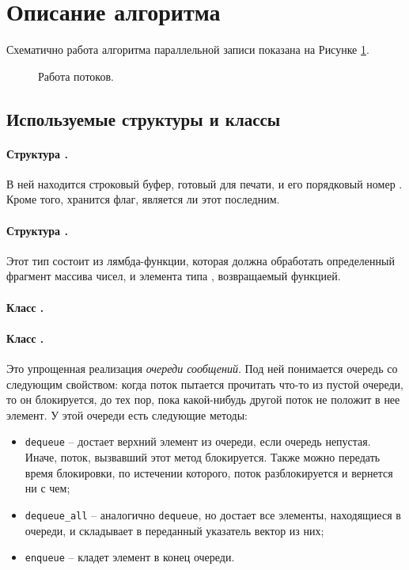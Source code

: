 \section{Описание алгоритма} \label{sec1}
Схематично работа алгоритма параллельной записи показана на Рисунке \ref{draw}.
\begin{figure}[h!]
\begin{footnotesize}
\def\svgwidth{430pt}
  
  \caption{Работа потоков.} \label{draw}
\end{footnotesize}\end{figure}

\subsection{Используемые структуры и классы}
\paragraph{Структура \texttt{}.}
В ней находится строковый буфер, готовый для печати, и его порядковый номер \texttt{}.
Кроме того, хранится флаг, является ли этот \texttt{} последним.
\paragraph{Структура \texttt{}.}
Этот тип состоит из лямбда-функции, которая должна обработать определенный фрагмент массива чисел, и элемента типа \texttt{}, возвращаемый функцией.
\paragraph{Класс \texttt{}.}

\paragraph{Класс \texttt{}.}
Это упрощенная реализация \textit{очереди сообщений}.  
Под ней понимается очередь со следующим свойством: когда поток пытается прочитать что-то из пустой очереди, то он блокируется, до тех пор, пока какой-нибудь другой поток не положит в нее элемент.
У этой очереди есть следующие методы:
\begin{itemize}
\item \texttt{dequeue} -- достает верхний элемент из очереди, если очередь непустая.
Иначе, поток, вызвавший этот метод блокируется. Также можно передать время блокировки, по истечении которого, поток разблокируется и вернется ни с чем;
\item \texttt{dequeue\_all} -- аналогично \texttt{dequeue}, но достает все элементы, находящиеся в очереди, и складывает в переданный указатель вектор из них;
\item \texttt{enqueue} -- кладет элемент в конец очереди.
\end{itemize}

